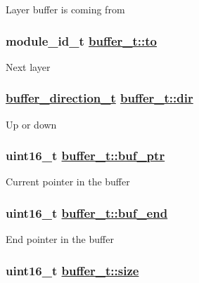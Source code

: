 Layer buffer is coming from \hypertarget{structbuffer__t_655f0a9f1662c7386e350d55b0ebe804}{
\subsubsection[to]{\setlength{\rightskip}{0pt plus 5cm}module\_\-id\_\-t \hyperlink{structbuffer__t_655f0a9f1662c7386e350d55b0ebe804}{buffer\_\-t::to}}}
\label{structbuffer__t_655f0a9f1662c7386e350d55b0ebe804}


Next layer \hypertarget{structbuffer__t_90c0669e859280525c9a16dc1d1a6153}{
\subsubsection[dir]{\setlength{\rightskip}{0pt plus 5cm}\hyperlink{buffer_8h_584321097d4e6c6a37198fbbb6d76c71}{buffer\_\-direction\_\-t} \hyperlink{structbuffer__t_90c0669e859280525c9a16dc1d1a6153}{buffer\_\-t::dir}}}
\label{structbuffer__t_90c0669e859280525c9a16dc1d1a6153}


Up or down \hypertarget{structbuffer__t_435b821b8f73bc752e5ed8b0edec6a2d}{
\subsubsection[buf\_\-ptr]{\setlength{\rightskip}{0pt plus 5cm}uint16\_\-t \hyperlink{structbuffer__t_435b821b8f73bc752e5ed8b0edec6a2d}{buffer\_\-t::buf\_\-ptr}}}
\label{structbuffer__t_435b821b8f73bc752e5ed8b0edec6a2d}


Current pointer in the buffer \hypertarget{structbuffer__t_93697fa152d62c9539dcd5b2f42b5d1d}{
\subsubsection[buf\_\-end]{\setlength{\rightskip}{0pt plus 5cm}uint16\_\-t \hyperlink{structbuffer__t_93697fa152d62c9539dcd5b2f42b5d1d}{buffer\_\-t::buf\_\-end}}}
\label{structbuffer__t_93697fa152d62c9539dcd5b2f42b5d1d}


End pointer in the buffer \hypertarget{structbuffer__t_71b3f12052a171249ae6ad4e08e93ec4}{
\subsubsection[size]{\setlength{\rightskip}{0pt plus 5cm}uint16\_\-t \hyperlink{structbuffer__t_71b3f12052a171249ae6ad4e08e93ec4}{buffer\_\-t::size}}}
\label{structbuffer__t_71b3f12052a171249ae6ad4e08e93ec4}


